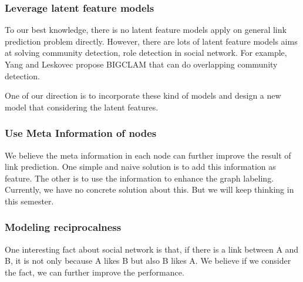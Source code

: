 \documentclass[paper=letter, fontsize=12pt]{scrartcl} %
\begin{document}
\subsubsection {Leverage latent feature models}
To our best knowledge, there is no latent feature models apply on general link prediction problem directly. However, there are lots of latent feature models aims at solving community detection, role detection in social network. For example, Yang and Leskovec \cite{bigclam} propose BIGCLAM that can do overlapping community detection. 

One of our direction is to incorporate these kind of models and design a new model that considering the latent features. 

\subsubsection {Use Meta Information of nodes}
We believe the meta information in each node can further improve the result of link prediction. One simple and naive solution is to add this information as feature. The other is to use the information to enhance the graph labeling. Currently, we have no concrete solution about this. But we will keep thinking in this semester.

\subsubsection {Modeling reciprocalness}
One interesting fact about social network is that, if there is a link between A and B, it is not only because A likes B but also B likes A. We believe if we consider the fact, we can further improve the performance.





\end{document}
